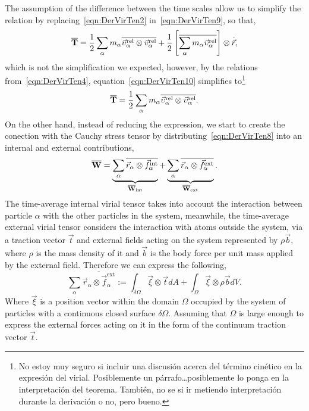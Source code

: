 \documentclass[../../main-notes.tex]{subfiles}
\begin{document}
The assumption of the difference between the time scales allow us to simplify the relation by replacing~\eqref{eqn:DerVirTen2} in~\eqref{eqn:DerVirTen9}, so that,
\begin{equation}
    \overline{\bold{T}}=
        \frac{1}{2}\sum_\alpha m_\alpha\overline{\vec{\upsilon}_\alpha^{\mathrm{rel}}\otimes\vec{v}_\alpha^{\mathrm{rel}}}
        +
        \frac{1}{2} \left[\overline{\sum_\alpha m_\alpha\vec{\upsilon}_\alpha^{\mathrm{rel}}}\right]\otimes\dot{\vec{r}}\label{eqn:DerVirTen10},
\end{equation}
which is not the simplification we expected, however, by the relations from~\eqref{eqn:DerVirTen4}, equation~\eqref{eqn:DerVirTen10} simplifies to\footnote{No estoy muy seguro si incluir una discusión acerca del término cinético en la expresión del virial. Posiblemente un párrafo\dots posiblemente lo ponga en la interpretación del teorema.
También, no se si ir metiendo interpretación durante la derivación o no, pero bueno.}
\begin{equation}
    \overline{\bold{T}}=
        \frac{1}{2}\sum_\alpha m_\alpha\overline{\vec{\upsilon}_\alpha^{\mathrm{rel}}\otimes\vec{\upsilon}_\alpha^{\mathrm{rel}}}\label{eqn:DerVirTen11}.
\end{equation}
On the other hand, instead of reducing the expression, we start to create the conection with the Cauchy stress tensor by distributing~\eqref{eqn:DerVirTen8} into an internal and external contributions,
\begin{equation}
    \overline{\bold{W}} = 
    \underbrace{\sum_\alpha\overline{\vec{r}_\alpha\otimes\vec{f}_\alpha^{\mathrm{int}}}}_{\overline{\bold{W}}_{\mathrm{int}}}
        +
        \underbrace{\sum_\alpha\overline{\vec{r}_\alpha\otimes\vec{f}_\alpha^{\mathrm{ext}}}}_{\overline{\bold{W}}_{\mathrm{ext}}}.\label{eqn:DerVirTen12}
\end{equation}
The time-average internal virial tensor takes into account the interaction between particle $\alpha$ with the other particles in the system, meanwhile, the time-average external virial tensor considers the interaction with atoms outside the system, via a traction vector $\vec{t}$ and external fields acting on the system represented by $\rho\vec{b}$, where $\rho$ is the mass density of it and $\vec{b}$ is the body force per unit mass applied by the external field.
Therefore we can express the following,
\begin{equation}
    \sum_\alpha\overline{\vec{r}_\alpha\otimes\vec{f}_\alpha^{\mathrm{ext}}}
    :=
    \int_{\delta\Omega}\vec{\xi}\otimes\vec{t}dA 
    +
    \int_{\Omega}\vec{\xi}\otimes\rho\vec{b}dV. \label{eqn:DerVirTen13}
\end{equation}
Where $\vec{\xi}$ is a position vector within the domain $\Omega$ occupied by the system of particles with a continuous closed surface $\delta\Omega$.
Assuming that $\Omega$ is large enough to express the external forces acting on it in the form of the continuum traction vector $\vec{t}$.
\end{document}
